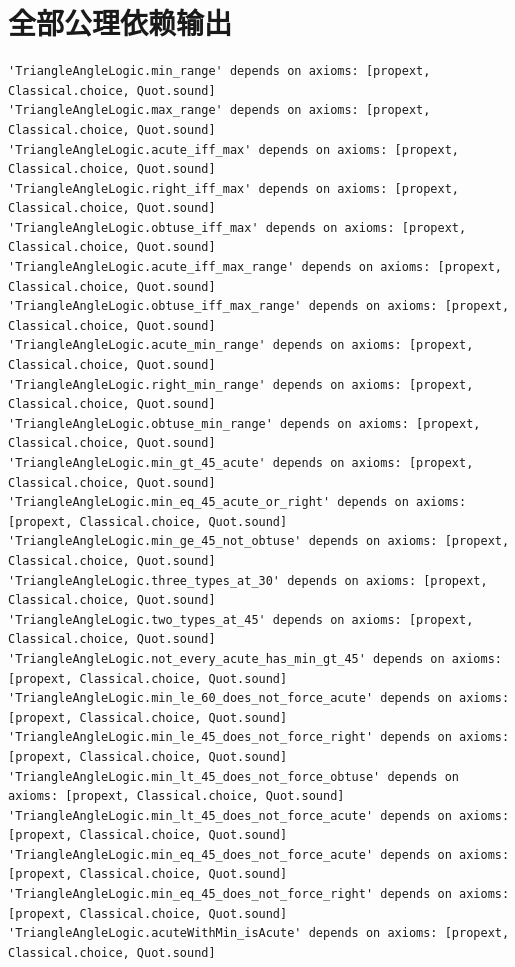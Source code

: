 \documentclass[UTF8,a4paper,zihao=-4,oneside,openany,fontset=fandol]{ctexbook}
\theoremstyle{definition}
\theoremstyle{remark}
\begin{document}
\section{全部公理依赖输出}
\begin{Verbatim}[fontsize=\fontsize{8.5}{11}\selectfont]
'TriangleAngleLogic.min_range' depends on axioms: [propext, Classical.choice, Quot.sound]
'TriangleAngleLogic.max_range' depends on axioms: [propext, Classical.choice, Quot.sound]
'TriangleAngleLogic.acute_iff_max' depends on axioms: [propext, Classical.choice, Quot.sound]
'TriangleAngleLogic.right_iff_max' depends on axioms: [propext, Classical.choice, Quot.sound]
'TriangleAngleLogic.obtuse_iff_max' depends on axioms: [propext, Classical.choice, Quot.sound]
'TriangleAngleLogic.acute_iff_max_range' depends on axioms: [propext, Classical.choice, Quot.sound]
'TriangleAngleLogic.obtuse_iff_max_range' depends on axioms: [propext, Classical.choice, Quot.sound]
'TriangleAngleLogic.acute_min_range' depends on axioms: [propext, Classical.choice, Quot.sound]
'TriangleAngleLogic.right_min_range' depends on axioms: [propext, Classical.choice, Quot.sound]
'TriangleAngleLogic.obtuse_min_range' depends on axioms: [propext, Classical.choice, Quot.sound]
'TriangleAngleLogic.min_gt_45_acute' depends on axioms: [propext, Classical.choice, Quot.sound]
'TriangleAngleLogic.min_eq_45_acute_or_right' depends on axioms: [propext, Classical.choice, Quot.sound]
'TriangleAngleLogic.min_ge_45_not_obtuse' depends on axioms: [propext, Classical.choice, Quot.sound]
'TriangleAngleLogic.three_types_at_30' depends on axioms: [propext, Classical.choice, Quot.sound]
'TriangleAngleLogic.two_types_at_45' depends on axioms: [propext, Classical.choice, Quot.sound]
'TriangleAngleLogic.not_every_acute_has_min_gt_45' depends on axioms: [propext, Classical.choice, Quot.sound]
'TriangleAngleLogic.min_le_60_does_not_force_acute' depends on axioms: [propext, Classical.choice, Quot.sound]
'TriangleAngleLogic.min_le_45_does_not_force_right' depends on axioms: [propext, Classical.choice, Quot.sound]
'TriangleAngleLogic.min_lt_45_does_not_force_obtuse' depends on axioms: [propext, Classical.choice, Quot.sound]
'TriangleAngleLogic.min_lt_45_does_not_force_acute' depends on axioms: [propext, Classical.choice, Quot.sound]
'TriangleAngleLogic.min_eq_45_does_not_force_acute' depends on axioms: [propext, Classical.choice, Quot.sound]
'TriangleAngleLogic.min_eq_45_does_not_force_right' depends on axioms: [propext, Classical.choice, Quot.sound]
'TriangleAngleLogic.acuteWithMin_isAcute' depends on axioms: [propext, Classical.choice, Quot.sound]

\end{Verbatim}
\end{document}
